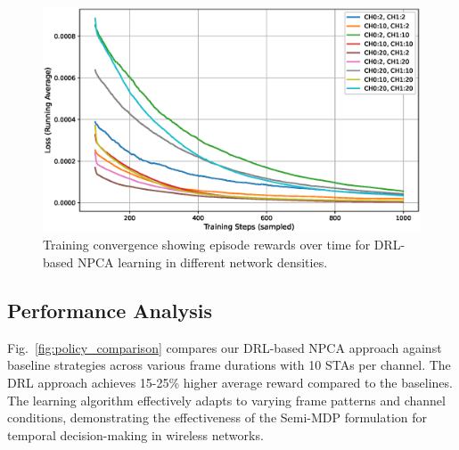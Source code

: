 \documentclass[conference]{IEEEtran}
\begin{document}
\begin{figure}
\centerline{\includegraphics[width=\columnwidth]{figure/loss_curves_ax7.eps}}
\caption{Training convergence showing episode rewards over time for DRL-based NPCA learning in different network densities.}
\label{fig:training_convergence}
\end{figure}

\subsection{Performance Analysis}

Fig.~\ref{fig:policy_comparison} compares our DRL-based NPCA approach against baseline strategies across various frame durations with 10 STAs per channel. The DRL approach achieves 15-25\% higher average reward compared to the baselines. The learning algorithm effectively adapts to varying frame patterns and channel conditions, demonstrating the effectiveness of the Semi-MDP formulation for temporal decision-making in wireless networks.

\end{document}
